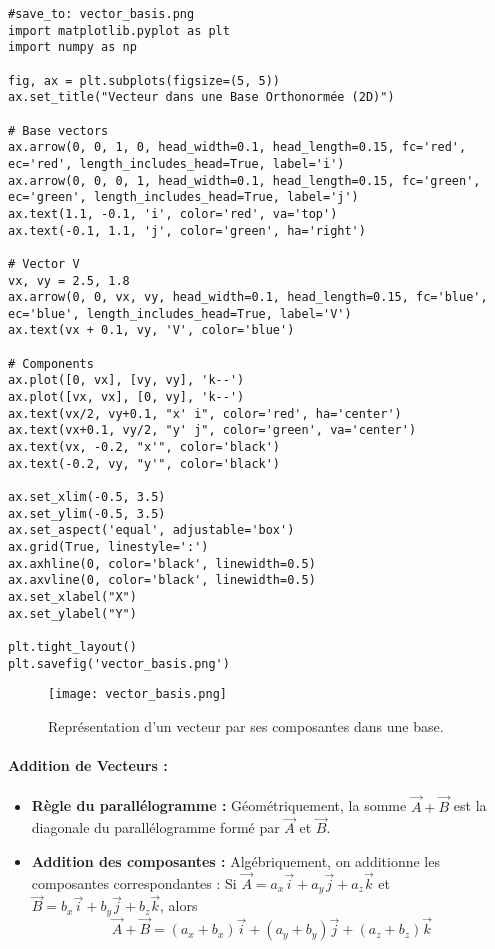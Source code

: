 \documentclass{article}
\begin{document}
\begin{verbatim}
#save_to: vector_basis.png
import matplotlib.pyplot as plt
import numpy as np

fig, ax = plt.subplots(figsize=(5, 5))
ax.set_title("Vecteur dans une Base Orthonormée (2D)")

# Base vectors
ax.arrow(0, 0, 1, 0, head_width=0.1, head_length=0.15, fc='red', ec='red', length_includes_head=True, label='i')
ax.arrow(0, 0, 0, 1, head_width=0.1, head_length=0.15, fc='green', ec='green', length_includes_head=True, label='j')
ax.text(1.1, -0.1, 'i', color='red', va='top')
ax.text(-0.1, 1.1, 'j', color='green', ha='right')

# Vector V
vx, vy = 2.5, 1.8
ax.arrow(0, 0, vx, vy, head_width=0.1, head_length=0.15, fc='blue', ec='blue', length_includes_head=True, label='V')
ax.text(vx + 0.1, vy, 'V', color='blue')

# Components
ax.plot([0, vx], [vy, vy], 'k--')
ax.plot([vx, vx], [0, vy], 'k--')
ax.text(vx/2, vy+0.1, "x' i", color='red', ha='center')
ax.text(vx+0.1, vy/2, "y' j", color='green', va='center')
ax.text(vx, -0.2, "x'", color='black')
ax.text(-0.2, vy, "y'", color='black')

ax.set_xlim(-0.5, 3.5)
ax.set_ylim(-0.5, 3.5)
ax.set_aspect('equal', adjustable='box')
ax.grid(True, linestyle=':')
ax.axhline(0, color='black', linewidth=0.5)
ax.axvline(0, color='black', linewidth=0.5)
ax.set_xlabel("X")
ax.set_ylabel("Y")

plt.tight_layout()
plt.savefig('vector_basis.png')
\end{verbatim}

\begin{figure}[H]
\centering
\texttt{[image: vector\_basis.png]}
\caption{Représentation d'un vecteur par ses composantes dans une base.}
\label{fig:vector_basis}
\end{figure}


\paragraph{Addition de Vecteurs :}
\begin{itemize}
    \item \textbf{Règle du parallélogramme :} Géométriquement, la somme $\vec{A} + \vec{B}$ est la diagonale du parallélogramme formé par $\vec{A}$ et $\vec{B}$.
    \item \textbf{Addition des composantes :} Algébriquement, on additionne les composantes correspondantes :
    Si $\vec{A} = a_x \vec{i} + a_y \vec{j} + a_z \vec{k}$ et $\vec{B} = b_x \vec{i} + b_y \vec{j} + b_z \vec{k}$, alors
    \[ \vec{A} + \vec{B} = (a_x + b_x) \vec{i} + (a_y + b_y) \vec{j} + (a_z + b_z) \vec{k} \]
\end{itemize}
\end{document}
